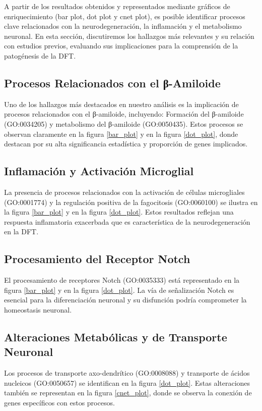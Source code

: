 A partir de los resultados obtenidos y representados mediante gráficos de enriquecimiento (bar plot, dot plot y cnet plot), es posible identificar procesos clave relacionados con la neurodegeneración, la inflamación y el metabolismo neuronal. En esta sección, discutiremos los hallazgos más relevantes y su relación con estudios previos, evaluando sus implicaciones para la comprensión de la patogénesis de la DFT.

\subsection{Procesos Relacionados con el β-Amiloide}

Uno de los hallazgos más destacados en nuestro análisis es la implicación de procesos relacionados con el β-amiloide, incluyendo: Formación del β-amiloide (GO:0034205) y metabolismo del β-amiloide (GO:0050435). Estos procesos se observan claramente en la figura \ref{bar_plot} y en la figura \ref{dot_plot}, donde destacan por su alta significancia estadística y proporción de genes implicados.


\subsection{Inflamación y Activación Microglial}

La presencia de procesos relacionados con la activación de células microgliales (GO:0001774) y la regulación positiva de la fagocitosis (GO:0060100) se ilustra en la figura \ref{bar_plot} y en la figura \ref{dot_plot}. Estos resultados reflejan una respuesta inflamatoria exacerbada que es característica de la neurodegeneración en la DFT.


\subsection{Procesamiento del Receptor Notch}

El procesamiento de receptores Notch (GO:0035333) está representado en la figura \ref{bar_plot} y en la figura \ref{dot_plot}. La vía de señalización Notch es esencial para la diferenciación neuronal y su disfunción podría comprometer la homeostasis neuronal.

\subsection{Alteraciones Metabólicas y de Transporte Neuronal}

Los procesos de transporte axo-dendrítico (GO:0008088) y transporte de ácidos nucleicos (GO:0050657) se identifican en la figura \ref{dot_plot}. Estas alteraciones también se representan en la figura \ref{cnet_plot}, donde se observa la conexión de genes específicos con estos procesos.

